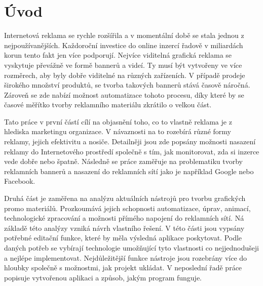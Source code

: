 \chapter{Úvod}
\label{chap:Introduction}
Internetová reklama se rychle rozšířila a v momentální době se stala jednou z nejpoužívanějších. Každoroční investice do online inzercí řadově v miliardách korun tento fakt jen více podporují.
Nejvíce viditelná grafická reklama se vyskytuje převážně ve formě bannerů a videí. Ty musí být vytvořeny ve více rozměrech, aby byly dobře viditelné na různých zařízeních.
V případě prodeje širokého množství produktů, se tvorba takových bannerů stává časově náročná. Zároveň se zde nabízí možnost automatizace tohoto procesu, díky které by se 
časové měřítko tvorby reklamního materiálu zkrátilo o velkou část.

Tato práce v první částí cílí na objasnění toho, co to vlastně reklama je z hlediska marketingu organizace. V návaznosti na to rozebírá různé formy reklamy, jejich efektivitu
a nosiče. Detailněji jsou zde popsány možnosti nasazení reklamy do Internetového prostředí společně s tím, jak monitorovat, zda si inzerce vede dobře nebo špatně.
Následně se práce zaměřuje na problematiku tvorby reklamních bannerů a nasazení do reklamních sítí jako je například Google nebo Facebook.

Druhá část je zaměřena na analýzu aktuálních nástrojů pro tvorbu grafických promo materiálů. Prozkoumává jejich schopnosti automatizace, úprav, animací, technologické zpracování a možnosti
přímého napojení do reklamních sítí.
Ná základě této analýzy vzniká návrh vlastního řešení. V této části jsou vypsány potřebné editační funkce, které by měla výsledná aplikace poskytovat. Podle daných potřeb
se vybírají technologie umožňující tyto vlastnosti co nejjednodušeji a nejlépe implementovat. Nejdůležitější funkce nástroje jsou rozebrány více do hloubky společně s možnostmi,
jak projekt ukládat.
V neposlední řadě práce popisuje vytvořenou aplikaci a způsob, jakým program funguje.


\endinput